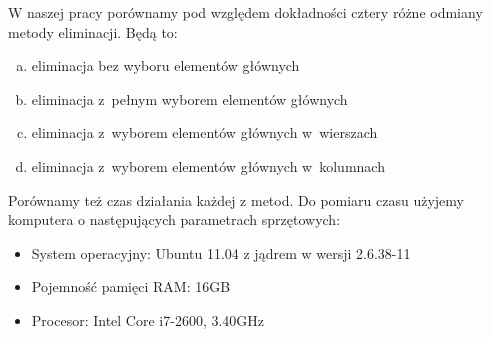 \documentclass[a4paper]{article}
\makeatletter
\def\namedlabel#1#2{\begingroup
   \def\@currentlabel{#2}%
   \label{#1}\endgroup
}
\makeatother
\begin{document}
W naszej pracy porównamy pod względem dokładności cztery różne odmiany metody eliminacji. Będą to:
\begin{enumerate}[(a)]
 \item eliminacja bez wyboru elementów głównych \namedlabel{eliminacjaBezTekst}{eliminacja bez wyboru elementów głównych}
 \item eliminacja z~pełnym wyborem elementów głównych \namedlabel{eliminacjaWszystkoTekst}{eliminacja z~pełnym wyborem elementów głównych}
 \item eliminacja z~wyborem elementów głównych w~wierszach \namedlabel{eliminacjaWierszTekst}{eliminacja z~wyborem elementów głównych w~wierszach}
 \item eliminacja z~wyborem elementów głównych w~kolumnach \namedlabel{eliminacjaKolumnaTekst}{eliminacja z~wyborem elementów głównych w~kolumnach}
\end{enumerate}
Porównamy też czas działania każdej z metod. Do pomiaru czasu użyjemy komputera o następujących parametrach sprzętowych:
\begin{itemize}
 \item System operacyjny: Ubuntu 11.04 z jądrem w wersji 2.6.38-11
 \item Pojemność pamięci RAM: 16GB
 \item Procesor: Intel Core i7-2600, 3.40GHz
\end{itemize}
\end{document}

